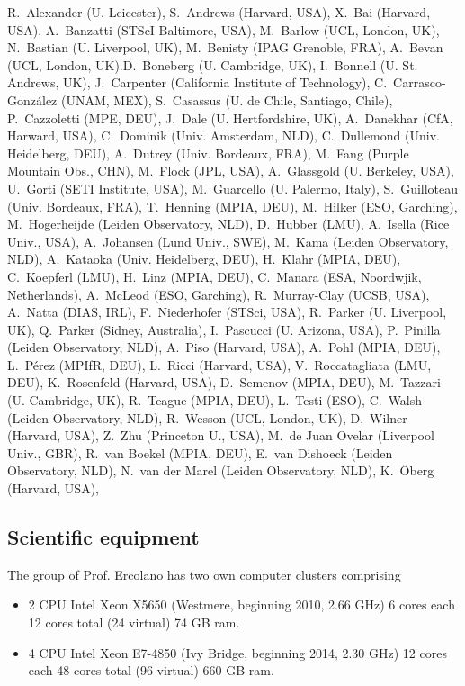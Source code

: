 \documentclass[10pt,fleqn,twoside]{article}
\newcommand{\Tcol}{\color{blue}}
\begin{document}

R.~Alexander (U. Leicester),
S.~Andrews (Harvard, USA),
X.~Bai (Harvard, USA),
A.~Banzatti (STScI Baltimore, USA),
M.~Barlow (UCL, London, UK),
N.~Bastian (U. Liverpool, UK),
M.~Benisty (IPAG Grenoble, FRA),
A.~Bevan (UCL, London, UK).D.~Boneberg (U. Cambridge, UK),
I.~Bonnell (U. St. Andrews, UK),
J.~Carpenter (California Institute of Technology),
C.~Carrasco-González (UNAM, MEX),
S.~Casassus (U. de Chile, Santiago, Chile),
P.~Cazzoletti (MPE, DEU),
J.~Dale (U. Hertfordshire, UK),
A.~Danekhar (CfA, Harward, USA),
C.~Dominik (Univ. Amsterdam, NLD),
C.~Dullemond (Univ. Heidelberg, DEU),
A.~Dutrey (Univ. Bordeaux, FRA),
M.~Fang (Purple Mountain Obs., CHN),
M.~Flock (JPL, USA),
A.~Glassgold (U. Berkeley, USA),
U.~Gorti (SETI Institute, USA),
M.~Guarcello (U. Palermo, Italy),
S.~Guilloteau (Univ. Bordeaux, FRA),
T.~Henning (MPIA, DEU),
M.~Hilker (ESO, Garching),
M.~Hogerheijde (Leiden Observatory, NLD),
D.~Hubber (LMU),
A.~Isella (Rice Univ., USA),
A.~Johansen (Lund Univ., SWE),
M.~Kama (Leiden Observatory, NLD),
A.~Kataoka (Univ. Heidelberg, DEU),
H.~Klahr (MPIA, DEU),
C.~Koepferl (LMU),
H.~Linz (MPIA, DEU),
C.~Manara (ESA, Noordwjik, Netherlands),
A.~McLeod (ESO, Garching),
R.~Murray-Clay (UCSB, USA),
A.~Natta (DIAS, IRL),
F.~Niederhofer (STSci, USA),
R.~Parker (U. Liverpool, UK),
Q.~Parker (Sidney, Australia),
I.~Pascucci (U. Arizona, USA),
P.~Pinilla (Leiden Observatory, NLD),
A.~Piso (Harvard, USA),
A.~Pohl (MPIA, DEU),
L.~Pérez (MPIfR, DEU),
L.~Ricci (Harvard, USA),
V.~Roccatagliata (LMU, DEU),
K.~Rosenfeld (Harvard, USA),
D.~Semenov (MPIA, DEU),
M.~Tazzari (U. Cambridge, UK),
R.~Teague (MPIA, DEU),
L.~Testi (ESO),
C.~Walsh (Leiden Observatory, NLD),
R.~Wesson (UCL, London, UK),
D.~Wilner (Harvard, USA),
Z.~Zhu (Princeton U., USA),
M.~de Juan Ovelar (Liverpool Univ., GBR),
R.~van Boekel (MPIA, DEU),
E.~van Dishoeck (Leiden Observatory, NLD),
N.~van der Marel (Leiden Observatory, NLD),
K.~Öberg (Harvard, USA),


\subsection{\Tcol Scientific equipment}

The group of Prof. Ercolano has two own computer clusters comprising 

\begin{itemize}
\item 2 CPU Intel Xeon X5650 (Westmere, beginning
2010, 2.66 GHz) 6 cores each 12 cores total (24 virtual) 74 GB ram.

\item 4 CPU Intel Xeon E7-4850 (Ivy Bridge, beginning 2014, 2.30 GHz)
12 cores each 48 cores total (96 virtual) 660 GB ram.

\end{itemize}
\end{document}
